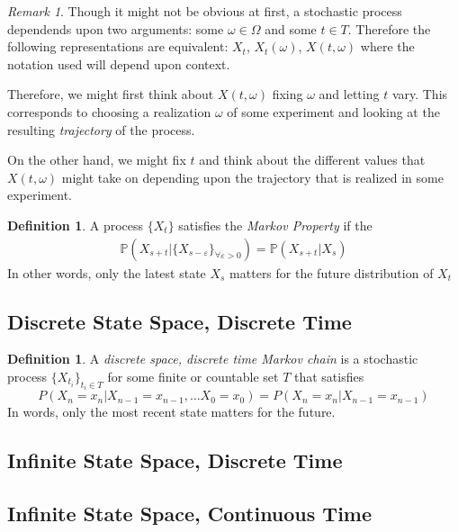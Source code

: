 \documentclass[a4paper,12pt]{article}
\theoremstyle{plain}
\theoremstyle{definition}
\newtheorem{defn}[thm]{Definition}
\theoremstyle{remark}
\newtheorem*{rmk}{Remark}
\begin{document}
\begin{rmk}
Though it might not be obvious at first, a stochastic process dependends
upon two arguments: some $\omega\in\Omega$ and some $t\in T$. Therefore
the following representations are equivalent: $X_t$, $X_t(\omega)$,
$X(t,\omega)$ where the notation used will depend upon context.

Therefore, we might first think about $X(t,\omega)$ fixing $\omega$ and
letting $t$ vary. This corresponds to choosing a realization $\omega$ of
some experiment and looking at the resulting \emph{trajectory} of the
process.

On the other hand, we might fix $t$ and think about the different values
that $X(t,\omega)$ might take on depending upon the trajectory that is
realized in some experiment.
\end{rmk}

\begin{defn}
A process $\{X_t\}$ satisfies the \emph{Markov Property} if the
\begin{align*}
\mathbb{P}\left(X_{s+t} | \{X_{s-\varepsilon}\}_{\forall\varepsilon>0}\right)
= \mathbb{P}\left(X_{s+t} | X_{s}\right)
\end{align*}
In other words, only the latest state $X_s$ matters for the future distribution of $X_t$

\end{defn}

\subsection{Discrete State Space, Discrete Time}

\begin{defn}
A \emph{discrete space, discrete time Markov chain} is a stochastic
process $\{X_{t_i}\}_{t_i\in T}$ for some finite or countable set $T$
that satisfies
\begin{equation}
  P(X_n = x_n | X_{n-1} = x_{n-1}, \ldots
  X_0 = x_0) = P(X_n = x_n | X_{n-1}=x_{n-1})
\end{equation}
In words, only the most recent state matters for the future.
\end{defn}

\subsection{Infinite State Space, Discrete Time}
\subsection{Infinite State Space, Continuous Time}
\end{document}
